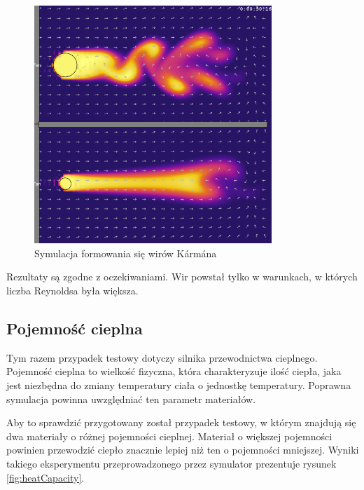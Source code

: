 \begin{figure}[!h]
\centering
\includegraphics[width=0.8\textwidth]{img/physics/karman}
\caption{Symulacja formowania się wirów Kármána}
\label{fig:physKarman}
\end{figure}

Rezultaty są zgodne z oczekiwaniami. Wir powstał tylko w warunkach, w których
liczba Reynoldsa była większa.

\subsection{Pojemność cieplna}

Tym razem przypadek testowy dotyczy silnika przewodnictwa cieplnego. Pojemność
cieplna to wielkość fizyczna, która charakteryzuje ilość ciepła, jaka jest
niezbędna do zmiany temperatury ciała o jednostkę temperatury. Poprawna
symulacja powinna uwzględniać ten parametr materiałów.

Aby to sprawdzić przygotowany został przypadek testowy, w którym znajdują się
dwa materiały o różnej pojemności cieplnej. Materiał o większej pojemności
powinien przewodzić ciepło znacznie lepiej niż ten o pojemności mniejszej.
Wyniki takiego eksperymentu przeprowadzonego przez symulator \en prezentuje
rysunek \ref{fig:heatCapacity}.

